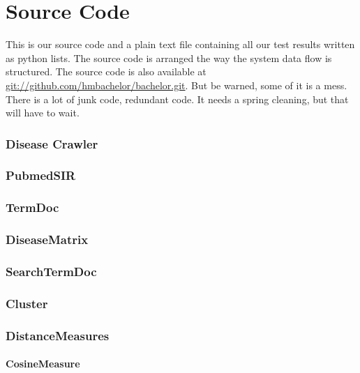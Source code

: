 \chapter{Source Code}

This is our source code and a plain text file containing all our test
results written as python lists. The source code is arranged the way
the system data flow is structured. The source code is also available
at
\href{git://github.com/hmbachelor/bachelor.git}{git://github.com/hmbachelor/bachelor.git}.
But be warned, some of it is a mess. There is a lot of junk code,
redundant code. It needs a spring cleaning, but that will have to
wait.

\subsection*{Disease Crawler}


\subsection*{PubmedSIR}


\subsection*{TermDoc}


\subsection*{DiseaseMatrix}


\subsection*{SearchTermDoc}


\subsection*{Cluster}


\subsection*{DistanceMeasures}
\subsubsection{CosineMeasure}

